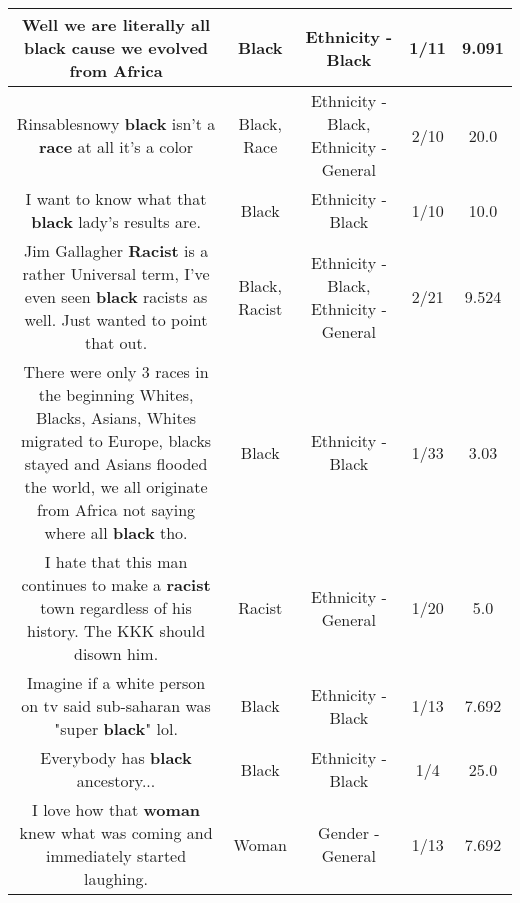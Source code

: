 \documentclass[11pt]{article}
\newlength\mylength
\begin{document}
\begin{center}
\begin{longtable}{|C{.65\mylength}|C{.30\mylength}|C{.12\mylength}|C{.12\mylength}|C{.12\mylength}|}
  \small Well we are literally all \textbf{black} cause we evolved from Africa\normalsize   & Black & Ethnicity - Black & 1/11 & 9.091 \\  \hline
  \small Rinsablesnowy \textbf{black} isn't a \textbf{race} at all it's a color\normalsize   & Black, Race & Ethnicity - Black, Ethnicity - General & 2/10 & 20.0 \\  \hline
  \small I want to know what that \textbf{black} lady's results are.\normalsize   & Black & Ethnicity - Black & 1/10 & 10.0 \\  \hline
  \small Jim Gallagher \textbf{Racist} is a rather Universal term, I've even seen \textbf{black} racists as well. Just wanted to point that out.\normalsize   & Black, Racist & Ethnicity - Black, Ethnicity - General & 2/21 & 9.524 \\  \hline
  \small There were only 3 races in the beginning Whites, Blacks, Asians, Whites migrated to Europe, blacks stayed and Asians flooded the world, we all originate from Africa not saying where all \textbf{black} tho.\normalsize   & Black & Ethnicity - Black & 1/33 & 3.03 \\  \hline
  \small I hate that this man continues to make a \textbf{racist} town regardless of his history. The KKK should disown him.\normalsize   & Racist & Ethnicity - General & 1/20 & 5.0 \\  \hline
  \small Imagine if a white person on tv said sub-saharan was "super \textbf{black}" lol.\normalsize   & Black & Ethnicity - Black & 1/13 & 7.692 \\  \hline
  \small Everybody has \textbf{black} ancestory...\normalsize   & Black & Ethnicity - Black & 1/4 & 25.0 \\  \hline
  \small I love how that \textbf{woman} knew what was coming and immediately started laughing.\normalsize   & Woman & Gender - General & 1/13 & 7.692 \\  \hline

\end{longtable}
\end{center}
\end{document}
